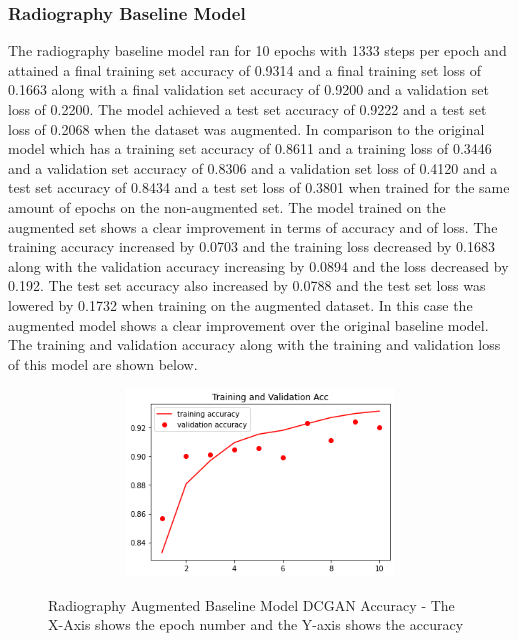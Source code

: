 \subsubsection{Radiography Baseline Model}
The radiography baseline model ran for 10 epochs with 1333 steps per epoch and attained a final training set accuracy of 0.9314 and a final training set loss of 0.1663 along with a final validation set accuracy of 0.9200 and a validation set loss of 0.2200.  The  model achieved a test set accuracy of 0.9222 and a test set loss of 0.2068 when the dataset was augmented.  In comparison to the original model which has a training set accuracy of 0.8611 and a training loss of 0.3446 and a validation set accuracy of  0.8306 and a validation set loss of 0.4120 and a test set accuracy of 0.8434 and a test set loss of 0.3801  when trained for the same amount of epochs on the non-augmented set. The model trained on the augmented set shows a clear improvement in terms of accuracy and of loss.  The training accuracy increased by 0.0703 and the training loss decreased by 0.1683 along with the validation accuracy increasing by 0.0894 and the loss decreased by 0.192. The test set accuracy also increased by 0.0788 and the test set loss was lowered by 0.1732 when training on the augmented dataset.  In this case the augmented model shows a clear improvement over the original baseline model. The training and validation accuracy along with the training and validation loss of this model are shown below.
 \begin{figure}[H]
    \centering    \includegraphics[width=1\textwidth,height=5cm,keepaspectratio]{Images/RadiographyCNNBaselineTrainAndValAccAugmentedDCGAN.png}\\
    \caption{Radiography Augmented Baseline Model DCGAN Accuracy - The X-Axis shows the epoch number and the Y-axis shows the accuracy}
    \label{fig:Radiography Augmented Baseline Model DCGAN Accuracy}
\end{figure}
